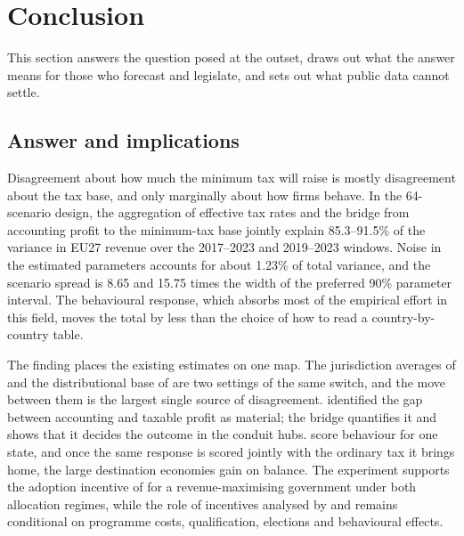 \documentclass[11pt,a4paper]{article}
\begin{document}
\section{Conclusion}\label{sec:conclusion}

This section answers the question posed at the outset, draws out what the answer means for those who forecast and legislate, and sets out what public data cannot settle.

\subsection{Answer and implications}\label{sec:answer}

Disagreement about how much the minimum tax will raise is mostly disagreement about the tax base, and only marginally about how firms behave. In the 64-scenario design, the aggregation of effective tax rates and the bridge from accounting profit to the minimum-tax base jointly explain 85.3–91.5\% of the variance in EU27 revenue over the 2017–2023 and 2019–2023 windows. Noise in the estimated parameters accounts for about 1.23\% of total variance, and the scenario spread is 8.65 and 15.75 times the width of the preferred 90\% parameter interval. The behavioural response, which absorbs most of the empirical effort in this field, moves the total by less than the choice of how to read a country-by-country table.

The finding places the existing estimates on one map. The jurisdiction averages of \citet{barake2022} and the distributional base of \citet{hugger2026} are two settings of the same switch, and the move between them is the largest single source of disagreement. \citet{hanlon2023} identified the gap between accounting and taxable profit as material; the bridge quantifies it and shows that it decides the outcome in the conduit hubs. \citet{boukal2026} score behaviour for one state, and once the same response is scored jointly with the ordinary tax it brings home, the large destination economies gain on balance. The experiment supports the adoption incentive of \citet{devereux2022} for a revenue-maximising government under both allocation regimes, while the role of incentives analysed by \citet{janeba2023} and \citet{schjelderup2024} remains conditional on programme costs, qualification, elections and behavioural effects.
\end{document}
